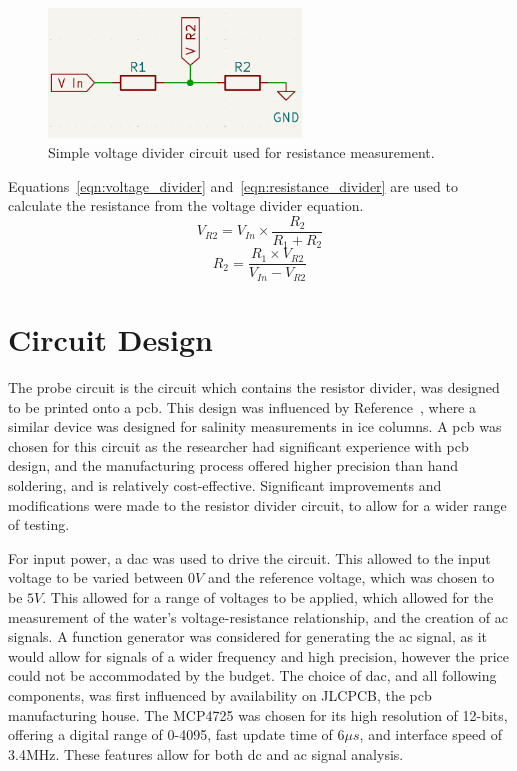 \begin{figure}[H]\label{fig:voltage_divider}
    \centering
    \includegraphics[width=0.6\textwidth]{figures/fig_voltage_divider.png}
    \caption{Simple voltage divider circuit used for resistance measurement.}
    \label{fig:voltage_divider}
\end{figure}

Equations~\ref{eqn:voltage_divider} and~\ref{eqn:resistance_divider} are used to calculate the resistance from the voltage divider equation.
\begin{equation}\label{eqn:voltage_divider}
    V_{R2} = V_{In} \times \frac{R_2}{R_1 + R_2}
\end{equation}
\begin{equation}\label{eqn:resistance_divider}
    R_2 = \frac{R_1 \times V_{R2}}{V_{In}-V_{R2}}
\end{equation}


\section{Circuit Design}\label{sec:circuit_design}
The probe circuit is the circuit which contains the resistor divider, was designed to be printed onto a \gls{pcb}.
This design was influenced by Reference~\cite{cam_clark}, where a similar device was designed for salinity measurements in ice columns.
A \gls{pcb} was chosen for this circuit as the researcher had significant experience with \gls{pcb} design, and the manufacturing process offered higher precision than hand soldering, and is relatively cost-effective.
Significant improvements and modifications were made to the resistor divider circuit, to allow for a wider range of testing.

For input power, a \gls{dac} was used to drive the circuit. This allowed to the input voltage to be varied between $0 V$ and the reference voltage, which was chosen to be $5V$.
This allowed for a range of voltages to be applied, which allowed for the measurement of the water's voltage-resistance relationship, and the creation of \gls{ac} signals.
A function generator was considered for generating the \gls{ac} signal, as it would allow for signals of a wider frequency and high precision, however the price could not be accommodated by the budget.
The choice of \gls{dac}, and all following components, was first influenced by availability on JLCPCB, the \gls{pcb} manufacturing house.
The MCP4725 was chosen for its high resolution of 12-bits, offering a digital range of 0-4095, fast update time of $6{\mu}s$, and interface speed of 3.4MHz.
These features allow for both \gls{dc} and \gls{ac} signal analysis.

